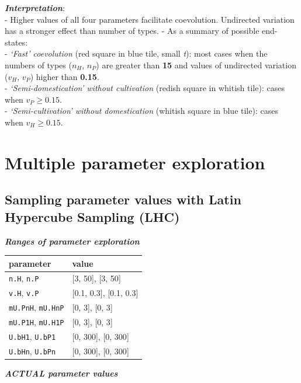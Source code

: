 \documentclass[]{book}
\begin{document}
\textbf{\emph{Interpretation}}:\\
- Higher values of all four parameters facilitate coevolution. Undirected variation has a stronger effect than number of types.
- As a summary of possible end-states:\\
- \emph{`Fast' coevolution} (red square in blue tile, small \emph{t}): most cases when the numbers of types (\(n_{H}\), \(n_{P}\)) are greater than \textbf{15} and values of undirected variation (\(v_{H}\), \(v_{P}\)) higher than \textbf{0.15}.\\
- \emph{`Semi-domestication' without cultivation} (redish square in whitish tile): cases when \(v_{P}\geq 0.15\).\\
- \emph{`Semi-cultivation' without domestication} (whitish square in blue tile): cases when \(v_{H}\geq 0.15\).

\hypertarget{multiple-parameter-exploration}{%
\chapter{Multiple parameter exploration}\label{multiple-parameter-exploration}}

\newpage

\hypertarget{sampling-parameter-values-with-latin-hypercube-sampling-lhc}{%
\section{Sampling parameter values with Latin Hypercube Sampling (LHC)}\label{sampling-parameter-values-with-latin-hypercube-sampling-lhc}}

\textbf{\emph{Ranges of parameter exploration}}

\begin{longtable}[]{@{}ll@{}}
\toprule
\textbf{parameter} & \textbf{value}\tabularnewline
\midrule
\endhead
\texttt{n.H}, \texttt{n.P} & {[}3, 50{]}, {[}3, 50{]}\tabularnewline
\texttt{v.H}, \texttt{v.P} & {[}0.1, 0.3{]}, {[}0.1, 0.3{]}\tabularnewline
\texttt{mU.PnH}, \texttt{mU.HnP} & {[}0, 3{]}, {[}0, 3{]}\tabularnewline
\texttt{mU.P1H}, \texttt{mU.H1P} & {[}0, 3{]}, {[}0, 3{]}\tabularnewline
\texttt{U.bH1}, \texttt{U.bP1} & {[}0, 300{]}, {[}0, 300{]}\tabularnewline
\texttt{U.bHn}, \texttt{U.bPn} & {[}0, 300{]}, {[}0, 300{]}\tabularnewline
\bottomrule
\end{longtable}

\textbf{\emph{ACTUAL parameter values}}
\end{document}
